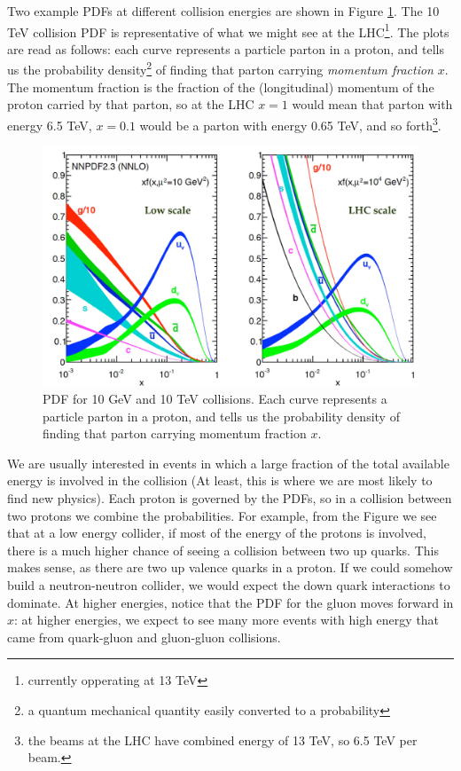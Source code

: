 Two example PDFs at different collision energies are shown in Figure \ref{Fig:Detect:PDFset}. The 10 TeV collision PDF is representative of what we might see at the LHC\footnote{currently opperating at 13 TeV}. The plots are read as follows: each curve represents a particle parton in a proton, and tells us the probability density\footnote{a quantum mechanical quantity easily converted to a probability} of finding that parton carrying \textit{momentum fraction} $x$. The momentum fraction is the fraction of the (longitudinal) momentum of the proton carried by that parton, so at the LHC $x=1$ would mean that parton with energy 6.5 TeV, $x=0.1$ would be a parton with energy 0.65 TeV, and so forth\footnote{the beams at the LHC have combined energy of 13 TeV, so 6.5 TeV per beam.}.
\begin{figure}[h!]
    \centering
        \includegraphics[width=\textwidth]{F3/PDFset}
        \caption{PDF for 10 GeV and 10 TeV collisions. Each curve represents a particle parton in a proton, and tells us the probability density of finding that parton carrying momentum fraction $x$.}
        \label{Fig:Detect:PDFset}
\end{figure}
We are usually interested in events in which a large fraction of the total available energy is involved in the collision (At least, this is where we are most likely to find new physics). Each proton is governed by the PDFs, so in a collision between two protons we combine the probabilities. For example, from the Figure we see that at a low energy collider, if most of the energy of the protons is involved, there is a much higher chance of seeing a collision between two up quarks. This makes sense, as there are two up valence quarks in a proton. If we could somehow build a neutron-neutron collider, we would expect the down quark interactions to dominate. At higher energies, notice that the PDF for the gluon moves forward in $x$: at higher energies, we expect to see many more events with high energy that came from quark-gluon and gluon-gluon collisions.

